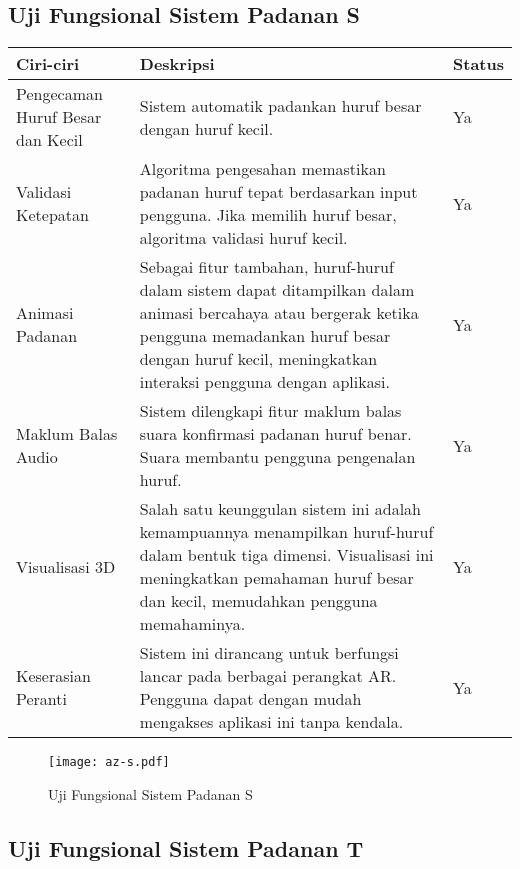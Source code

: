 \begin{itemize}
\begin{itemize}
\begin{itemize}
\begin{itemize}
\begin{itemize}
\begin{itemize}
\begin{itemize}
\begin{itemize}
\begin{flushleft}
\subsection{Uji Fungsional  Sistem Padanan S}

\begin{tabular}{>{\raggedright}p{3cm}p{9cm}>{\centering\arraybackslash}p{2cm}}
\toprule
\textbf{Ciri-ciri} & \textbf{Deskripsi} & \textbf{Status} \\
\midrule
Pengecaman Huruf Besar dan Kecil & Sistem automatik padankan huruf besar dengan huruf kecil. & Ya \\

Validasi Ketepatan & Algoritma pengesahan memastikan padanan huruf tepat berdasarkan input pengguna. Jika memilih huruf besar, algoritma validasi huruf kecil. & Ya \\

Animasi Padanan & Sebagai fitur tambahan, huruf-huruf dalam sistem dapat ditampilkan dalam animasi bercahaya atau bergerak ketika pengguna memadankan huruf besar dengan huruf kecil, meningkatkan interaksi pengguna dengan aplikasi. & Ya \\

Maklum Balas Audio & Sistem dilengkapi fitur maklum balas suara konfirmasi padanan huruf benar. Suara membantu pengguna pengenalan huruf. & Ya \\

Visualisasi 3D & Salah satu keunggulan sistem ini adalah kemampuannya menampilkan huruf-huruf dalam bentuk tiga dimensi. Visualisasi ini meningkatkan pemahaman huruf besar dan kecil, memudahkan pengguna memahaminya. & Ya \\

Keserasian Peranti & Sistem ini dirancang untuk berfungsi lancar pada berbagai perangkat AR. Pengguna dapat dengan mudah mengakses aplikasi ini tanpa kendala. & Ya \\
\bottomrule
\end{tabular}

\begin{figure}
    \centering
    \texttt{[image: az-s.pdf]}
    \caption{Uji Fungsional  Sistem Padanan S }
    \label{fig:az-s.pdf}
\end{figure}

\subsection{Uji Fungsional  Sistem Padanan T}


\end{flushleft}
\end{itemize}
\end{itemize}
\end{itemize}
\end{itemize}
\end{itemize}
\end{itemize}
\end{itemize}
\end{itemize}
